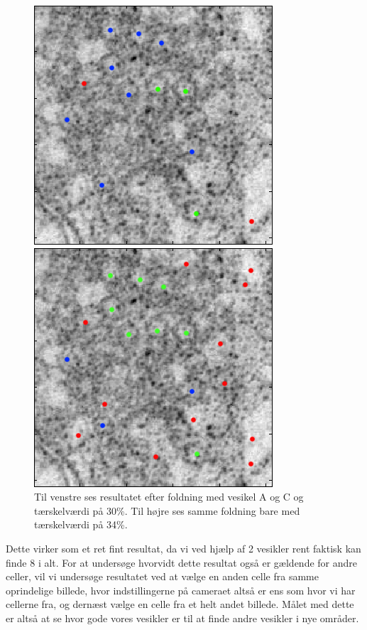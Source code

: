 \begin{figure}[H]
	\begin{minipage}[b]{0.5\linewidth}
		\includegraphics[scale=0.65]{files/postmethod/img/ves1+2_th-30_res2.png}
	\end{minipage}
	\hspace{0.5cm}
	\begin{minipage}[b]{0.5\linewidth}
		\includegraphics[scale=0.65]{files/postmethod/img/ves1+2_th-34_res2.png}
	\end{minipage}
	\caption{Til venstre ses resultatet efter foldning med vesikel A og C og tærskelværdi på 30\%. Til højre ses samme foldning bare med tærskelværdi på 34\%.\label{fig:postmethod_conv_ves_1}}
\end{figure}

Dette virker som et ret fint resultat, da vi ved hjælp af 2 vesikler rent faktisk kan finde 8 i alt. For at undersøge hvorvidt dette resultat også er gældende for andre celler, vil vi undersøge resultatet ved at vælge en anden celle fra samme oprindelige billede, hvor indstillingerne på cameraet altså er ens som hvor vi har cellerne fra, og dernæst vælge en celle fra et helt andet billede. Målet med dette er altså at se hvor gode vores vesikler er til at finde andre vesikler i nye områder.

